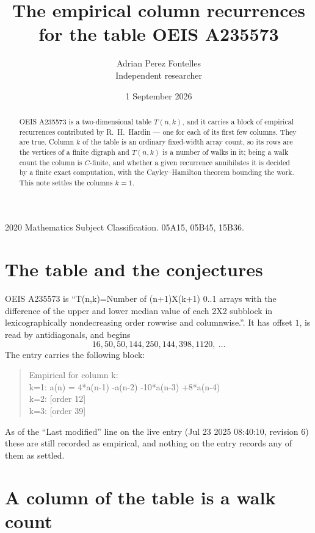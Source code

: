 \documentclass[11pt,a4paper]{article}
\title{The empirical column recurrences for the table OEIS A235573}
\author{Adrian Perez Fontelles\\ \small Independent researcher}
\date{1 September 2026}
\theoremstyle{plain}
\theoremstyle{definition}
\begin{document}
\maketitle

\begin{abstract}
OEIS A235573 is a two-dimensional table $T(n,k)$, and it carries a block of empirical
recurrences contributed by R.~H.~Hardin --- one for each of its first few columns. They are
true. Column $k$ of the table is an ordinary fixed-width array count, so its rows are the
vertices of a finite digraph and $T(n,k)$ is a number of walks in it; being a walk count the
column is $C$-finite, and whether a given recurrence annihilates it is decided by a finite
exact computation, with the Cayley--Hamilton theorem bounding the work. This note settles the columns $k=1$.
\end{abstract}

\noindent\small 2020 Mathematics Subject Classification. 05A15, 05B45, 15B36.\normalsize

\section{The table and the conjectures}

OEIS A235573 is ``T(n,k)=Number of (n+1)X(k+1) 0..1 arrays with the difference of the upper and lower median value of each 2X2 subblock in lexicographically nondecreasing order rowwise and columnwise.''. It has offset $1$, is
read by antidiagonals, and begins
\[
16, 50, 50, 144, 250, 144, 398, 1120,\ \dots
\]
The entry carries the following block:
\begin{quote}\small
Empirical for column k:\\
k=1: a(n) = 4*a(n-1) -a(n-2) -10*a(n-3) +8*a(n-4)\\
k=2: [order 12]\\
k=3: [order 39]\\
\end{quote}
As of the ``Last modified'' line on the live entry (Jul 23 2025 08:40:10, revision 6) these are still
recorded as empirical, and nothing on the entry records any of them as settled.

\section{A column of the table is a walk count}
\end{document}
